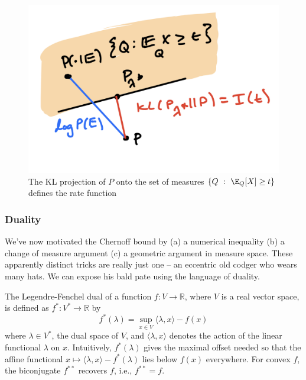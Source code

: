 \documentclass[
  letterpaper,
  DIV=11,
  numbers=noendperiod]{scrartcl}
\begin{document}
\begin{figure}[H]

{\centering \includegraphics[width=5.20833in,height=\textheight,keepaspectratio]{project.png}

}

\caption{The KL projection of \(P\) onto the set of measures
\(\{Q \ : \ \E_Q[X] \geq t\}\) defines the rate function}

\end{figure}%

\subsubsection{Duality}\label{duality}

We've now motivated the Chernoff bound by (a) a numerical inequality (b)
a change of measure argument (c) a geometric argument in measure space.
These apparently distinct tricks are really just one -- an eccentric old
codger who wears many hats. We can expose his bald pate using the
language of duality.

The Legendre-Fenchel dual of a function \(f: V \rightarrow \mathbb{R}\),
where \(V\) is a real vector space, is defined as
\(f^*: V^* \rightarrow \mathbb{R}\) by \[
f^*(\lambda) = \sup_{x \in V} \langle \lambda, x \rangle - f(x)
\] where \(\lambda \in V^*\), the dual space of \(V\), and
\(\langle \lambda, x \rangle\) denotes the action of the linear
functional \(\lambda\) on \(x\). Intuitively, \(f^*(\lambda)\) gives the
maximal offset needed so that the affine functional
\(x \mapsto \langle \lambda, x \rangle - f^*(\lambda)\) lies below
\(f(x)\) everywhere. For convex \(f\), the biconjugate \(f^{**}\)
recovers \(f\), i.e., \(f^{**} = f\).
\end{document}
